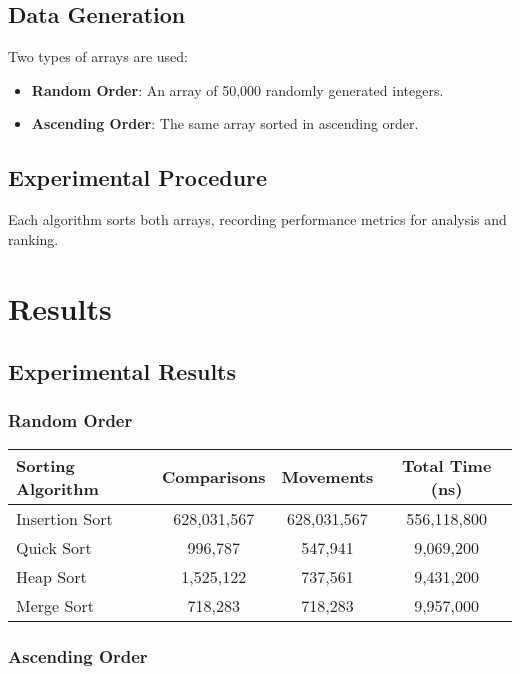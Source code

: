 \documentclass{article}
\begin{document}
\subsection{Data Generation}

Two types of arrays are used:
\begin{itemize}
    \item \textbf{Random Order}: An array of 50,000 randomly generated integers.
    \item \textbf{Ascending Order}: The same array sorted in ascending order.
\end{itemize}

\subsection{Experimental Procedure}

Each algorithm sorts both arrays, recording performance metrics for analysis and ranking.

\section{Results}

\subsection{Experimental Results}

\subsubsection{Random Order}

\begin{longtable}{lccc}
\toprule
\textbf{Sorting Algorithm} & \textbf{Comparisons} & \textbf{Movements} & \textbf{Total Time (ns)} \\
\midrule
Insertion Sort & 628,031,567 & 628,031,567 & 556,118,800 \\
Quick Sort     & 996,787     & 547,941     & 9,069,200   \\
Heap Sort      & 1,525,122   & 737,561     & 9,431,200   \\
Merge Sort     & 718,283     & 718,283     & 9,957,000   \\
\bottomrule
\end{longtable}

\subsubsection{Ascending Order}
\end{document}
